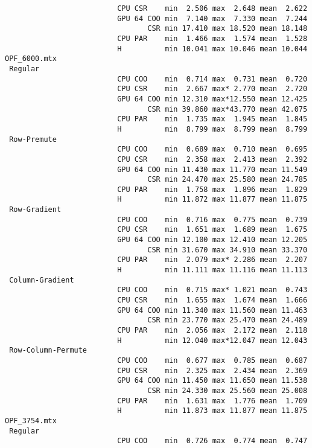 \begin{verbatim}
                          CPU CSR    min  2.506 max  2.648 mean  2.622
                          GPU 64 COO min  7.140 max  7.330 mean  7.244
                                 CSR min 17.410 max 18.520 mean 18.148
                          CPU PAR    min  1.466 max  1.574 mean  1.528
                          H          min 10.041 max 10.046 mean 10.044
OPF_6000.mtx
 Regular
                          CPU COO    min  0.714 max  0.731 mean  0.720
                          CPU CSR    min  2.667 max* 2.770 mean  2.720
                          GPU 64 COO min 12.310 max*12.550 mean 12.425
                                 CSR min 39.860 max*43.770 mean 42.075
                          CPU PAR    min  1.735 max  1.945 mean  1.845
                          H          min  8.799 max  8.799 mean  8.799
 Row-Premute
                          CPU COO    min  0.689 max  0.710 mean  0.695
                          CPU CSR    min  2.358 max  2.413 mean  2.392
                          GPU 64 COO min 11.430 max 11.770 mean 11.549
                                 CSR min 24.470 max 25.580 mean 24.785
                          CPU PAR    min  1.758 max  1.896 mean  1.829
                          H          min 11.872 max 11.877 mean 11.875
 Row-Gradient
                          CPU COO    min  0.716 max  0.775 mean  0.739
                          CPU CSR    min  1.651 max  1.689 mean  1.675
                          GPU 64 COO min 12.100 max 12.410 mean 12.205
                                 CSR min 31.670 max 34.910 mean 33.370
                          CPU PAR    min  2.079 max* 2.286 mean  2.207
                          H          min 11.111 max 11.116 mean 11.113
 Column-Gradient
                          CPU COO    min  0.715 max* 1.021 mean  0.743
                          CPU CSR    min  1.655 max  1.674 mean  1.666
                          GPU 64 COO min 11.340 max 11.560 mean 11.463
                                 CSR min 23.770 max 25.470 mean 24.489
                          CPU PAR    min  2.056 max  2.172 mean  2.118
                          H          min 12.040 max*12.047 mean 12.043
 Row-Column-Permute
                          CPU COO    min  0.677 max  0.785 mean  0.687
                          CPU CSR    min  2.325 max  2.434 mean  2.369
                          GPU 64 COO min 11.450 max 11.650 mean 11.538
                                 CSR min 24.330 max 25.560 mean 25.008
                          CPU PAR    min  1.631 max  1.776 mean  1.709
                          H          min 11.873 max 11.877 mean 11.875
OPF_3754.mtx
 Regular
                          CPU COO    min  0.726 max  0.774 mean  0.747

\end{verbatim}
